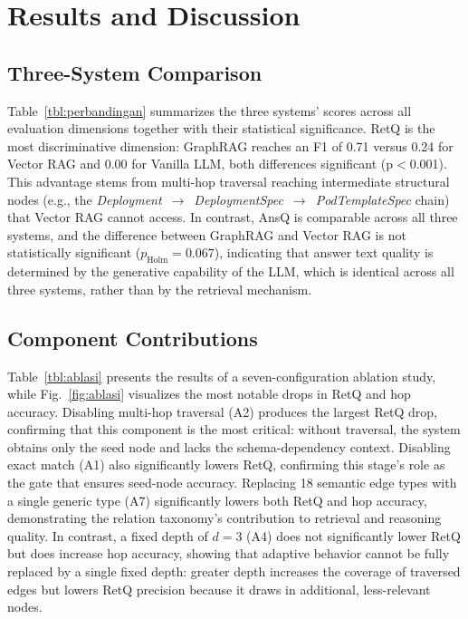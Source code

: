 \documentclass{ieeeaccess}
\begin{document}
\section{Results and Discussion}
\label{sec:hasil}

\subsection{Three-System Comparison}

Table~\ref{tbl:perbandingan} summarizes the three systems' scores across all evaluation dimensions together with their statistical significance. RetQ is the most discriminative dimension: GraphRAG reaches an F1 of 0.71 versus 0.24 for Vector RAG and 0.00 for Vanilla LLM, both differences significant (p$<$0.001). This advantage stems from multi-hop traversal reaching intermediate structural nodes (e.g., the \textit{Deployment}~$\to$~\textit{DeploymentSpec}~$\to$~\textit{PodTemplateSpec} chain) that Vector RAG cannot access. In contrast, AnsQ is comparable across all three systems, and the difference between GraphRAG and Vector RAG is not statistically significant ($p_{\text{Holm}}=0.067$), indicating that answer text quality is determined by the generative capability of the LLM, which is identical across all three systems, rather than by the retrieval mechanism.



\subsection{Component Contributions}

Table~\ref{tbl:ablasi} presents the results of a seven-configuration ablation study, while Fig.~\ref{fig:ablasi} visualizes the most notable drops in RetQ and hop accuracy. Disabling multi-hop traversal (A2) produces the largest RetQ drop, confirming that this component is the most critical: without traversal, the system obtains only the seed node and lacks the schema-dependency context. Disabling exact match (A1) also significantly lowers RetQ, confirming this stage's role as the gate that ensures seed-node accuracy. Replacing 18 semantic edge types with a single generic type (A7) significantly lowers both RetQ and hop accuracy, demonstrating the relation taxonomy's contribution to retrieval and reasoning quality. In contrast, a fixed depth of $d=3$ (A4) does not significantly lower RetQ but does increase hop accuracy, showing that adaptive behavior cannot be fully replaced by a single fixed depth: greater depth increases the coverage of traversed edges but lowers RetQ precision because it draws in additional, less-relevant nodes.
\end{document}
